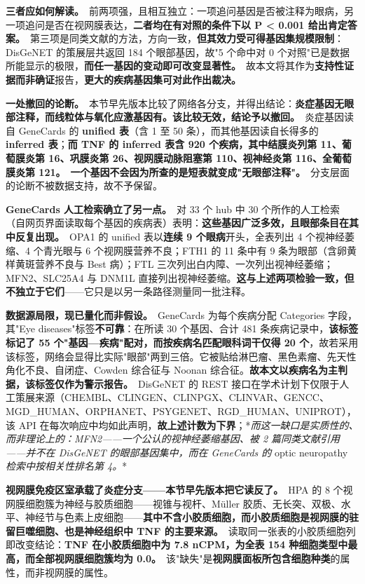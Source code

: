 \documentclass[UTF8,fontset=windows,11pt]{ctexart}
\begin{document}
\textbf{三者应如何解读。}\ 前两项强，且相互独立：一项追问基因是否被注释为眼病，另一项追问是否在视网膜表达，\textbf{二者均在有对照的条件下以 P < 0.001 给出肯定答案。}\ 第三项是同类文献的方法，方向一致，\textbf{但其效力受可得基因集规模限制}：DisGeNET 的策展层共返回 184 个眼部基因，故"5 个命中对 0 个对照"已是数据所能显示的极限，\textbf{而任一基因的变动即可改变显著性。}\ 故本文将其作为\textbf{支持性证据而非确证}报告，\textbf{更大的疾病基因集可对此作出裁决。}

\textbf{一处撤回的论断。}\ 本节早先版本比较了网络各分支，并得出结论：\textbf{炎症基因无眼部注释，而线粒体与氧化应激基因有。该比较无效，结论予以撤回。}\ 炎症基因读自 GeneCards 的 \textbf{unified 表}（含 1 至 50 条），而其他基因读自长得多的 \textbf{inferred 表}；\textbf{而 TNF 的 inferred 表含 920 个疾病，其中结膜炎列第 11、葡萄膜炎第 16、巩膜炎第 26、视网膜动脉阻塞第 110、视神经炎第 116、全葡萄膜炎第 121。}\ \textbf{一个基因不会因为所查的是短表就变成"无眼部注释"。}\ 分支层面的论断不被数据支持，故不予保留。

\textbf{GeneCards 人工检索确立了另一点。}\ 对 33 个 hub 中 30 个所作的人工检索（自网页界面读取每个基因的疾病表）表明：\textbf{这些基因广泛多效，且眼部条目在其中反复出现。}\ OPA1 的 unified 表以\textbf{连续 9 个眼病}开头，全表列出 4 个视神经萎缩、4 个青光眼与 6 个视网膜营养不良；FTH1 的 11 条中有 9 条为眼部（含卵黄样黄斑营养不良与 Best 病）；FTL 三次列出白内障、一次列出视神经萎缩；MFN2、SLC25A4 与 DNM1L 直接列出视神经萎缩。\textbf{这与上述两项检验一致，但不独立于它们}——它只是以另一条路径测量同一批注释。

\textbf{数据源局限，现已量化而非假设。}\ GeneCards 为每个疾病分配 Categories 字段，其"Eye diseases"标签\textbf{不可靠}：在所读 30 个基因、合计 481 条疾病记录中，\textbf{该标签标记了 55 个"基因—疾病"配对，而按疾病名匹配眼科词干仅得 20 个}，故若采用该标签，网络会显得比实际"眼部"两到三倍。它被贴给淋巴瘤、黑色素瘤、先天性角化不良、自闭症、Cowden 综合征与 Noonan 综合征。\textbf{故本文以疾病名为主判据，该标签仅作为警示报告。}\ DisGeNET 的 REST 接口在学术计划下仅限于人工策展来源（CHEMBL、CLINGEN、CLINPGX、CLINVAR、GENCC、MGD\_HUMAN、ORPHANET、PSYGENET、RGD\_HUMAN、UNIPROT），该 API 在每次响应中均如此声明，\textbf{故上述计数为下界}；*\textit{而这一缺口是实质性的、而非理论上的：MFN2——一个公认的视神经萎缩基因、被 2 篇同类文献引用——并不在 DisGeNET 的眼部基因集中，而在 GeneCards 的 }optic neuropathy\textit{ 检索中按相关性排名第 4。}*

\textbf{视网膜免疫区室承载了炎症分支——本节早先版本把它读反了。}\ HPA 的 8 个视网膜细胞簇为神经与胶质细胞——视锥与视杆、Müller 胶质、无长突、双极、水平、神经节与色素上皮细胞——\textbf{其中不含小胶质细胞，而小胶质细胞是视网膜的驻留巨噬细胞、也是神经组织中 TNF 的主要来源。}\ 读取同一张表的小胶质细胞列即改变结论：\textbf{TNF 在小胶质细胞中为 7.8 nCPM，为全表 154 种细胞类型中最高，而全部视网膜细胞簇均为 0.0。}\ 该"缺失"是\textbf{视网膜面板所包含细胞种类}的属性，而非视网膜的属性。
\end{document}
